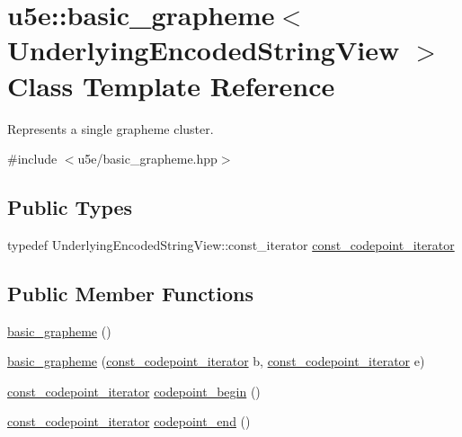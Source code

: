 \hypertarget{classu5e_1_1basic__grapheme}{}\section{u5e\+:\+:basic\+\_\+grapheme$<$ Underlying\+Encoded\+String\+View $>$ Class Template Reference}
\label{classu5e_1_1basic__grapheme}


Represents a single grapheme cluster.  




{\ttfamily \#include $<$u5e/basic\+\_\+grapheme.\+hpp$>$}

\subsection*{Public Types}
\begin{DoxyCompactItemize}
\item 
typedef Underlying\+Encoded\+String\+View\+::const\+\_\+iterator \hyperlink{classu5e_1_1basic__grapheme_ad2ae62d95df689316cd516736c0a3b92}{const\+\_\+codepoint\+\_\+iterator}
\end{DoxyCompactItemize}
\subsection*{Public Member Functions}
\begin{DoxyCompactItemize}
\item 
\hyperlink{classu5e_1_1basic__grapheme_a5fcb394f223a2b33f77ad64d33fc6f89}{basic\+\_\+grapheme} ()
\item 
\hyperlink{classu5e_1_1basic__grapheme_a07c3c5d726e070e1c4c8daf13f504916}{basic\+\_\+grapheme} (\hyperlink{classu5e_1_1basic__grapheme_ad2ae62d95df689316cd516736c0a3b92}{const\+\_\+codepoint\+\_\+iterator} b, \hyperlink{classu5e_1_1basic__grapheme_ad2ae62d95df689316cd516736c0a3b92}{const\+\_\+codepoint\+\_\+iterator} e)
\item 
\hyperlink{classu5e_1_1basic__grapheme_ad2ae62d95df689316cd516736c0a3b92}{const\+\_\+codepoint\+\_\+iterator} \hyperlink{classu5e_1_1basic__grapheme_a955bc52ec49af2aba6592ce717e05ca4}{codepoint\+\_\+begin} ()
\item 
\hyperlink{classu5e_1_1basic__grapheme_ad2ae62d95df689316cd516736c0a3b92}{const\+\_\+codepoint\+\_\+iterator} \hyperlink{classu5e_1_1basic__grapheme_a34222861fe382bd89ece4ed61e3e877f}{codepoint\+\_\+end} ()
\end{DoxyCompactItemize}


